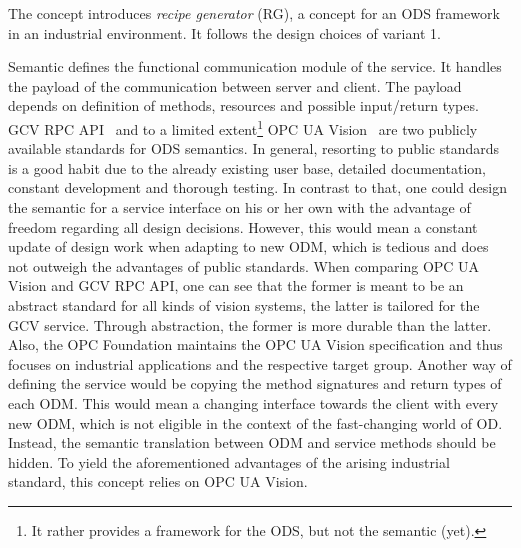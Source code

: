 \begin{table}[ht]
\begin{center}
\begin{minipage}{\textwidth}
      \end{minipage}
    \end{center}
\end{table}%

The concept introduces \textit{recipe generator} (RG), a concept for an ODS framework in an industrial environment. It follows the design choices of variant 1.

Semantic defines the functional communication module of the service. It handles the payload of the communication between server and client. The payload depends on definition of methods, resources and possible input/return types. GCV RPC API~\cite{Google-Cloud-Documentation2018Cloud2018} and to a limited extent\footnote{It rather provides a framework for the ODS, but not the semantic (yet).} OPC UA Vision~\cite{VDMA2018OPC40100-1:2018-11} are two publicly available standards for ODS semantics. In general, resorting to public standards is a good habit due to the already existing user base, detailed documentation, constant development and thorough testing. In contrast to that, one could design the semantic for a service interface on his or her own with the advantage of freedom regarding all design decisions. However, this would mean a constant update of design work when adapting to new ODM, which is tedious and does not outweigh the advantages of public standards. When comparing OPC UA Vision and GCV RPC API, one can see that the former is meant to be an abstract standard for all kinds of vision systems, the latter is tailored for the GCV service. Through abstraction, the former is more durable than the latter. Also, the OPC Foundation maintains the OPC UA Vision specification and thus focuses on industrial applications and the respective target group. Another way of defining the service would be copying the method signatures and return types of each ODM. This would mean a changing interface towards the client with every new ODM, which is not eligible in the context of the fast-changing world of OD. Instead, the semantic translation between ODM and service methods should be hidden. To yield the aforementioned advantages of the arising industrial standard, this concept relies on OPC UA Vision.


